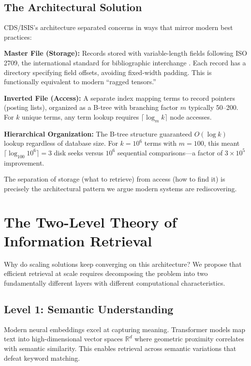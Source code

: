 \documentclass[manuscript,screen,nonacm]{acmart}
\begin{document}
\subsection{The Architectural Solution}

CDS/ISIS's architecture separated concerns in ways that mirror modern best practices:

\textbf{Master File (Storage):} Records stored with variable-length fields following ISO 2709, the international standard for bibliographic interchange \cite{iso2709}. Each record has a directory specifying field offsets, avoiding fixed-width padding. This is functionally equivalent to modern ``ragged tensors.''

\textbf{Inverted File (Access):} A separate index mapping terms to record pointers (posting lists), organized as a B-tree with branching factor $m$ typically 50--200. For $k$ unique terms, any term lookup requires $\lceil \log_m k \rceil$ node accesses.

\textbf{Hierarchical Organization:} The B-tree structure guaranteed $O(\log k)$ lookup regardless of database size. For $k = 10^6$ terms with $m = 100$, this meant $\lceil \log_{100} 10^6 \rceil = 3$ disk seeks versus $10^6$ sequential comparisons---a factor of $3 \times 10^5$ improvement.

The separation of storage (what to retrieve) from access (how to find it) is precisely the architectural pattern we argue modern systems are rediscovering.

\section{The Two-Level Theory of Information Retrieval}

Why do scaling solutions keep converging on this architecture? We propose that efficient retrieval at scale requires decomposing the problem into two fundamentally different layers with different computational characteristics.

\subsection{Level 1: Semantic Understanding}

Modern neural embeddings excel at capturing meaning. Transformer models map text into high-dimensional vector spaces $\mathbb{R}^d$ where geometric proximity correlates with semantic similarity. This enables retrieval across semantic variations that defeat keyword matching.
\end{document}
